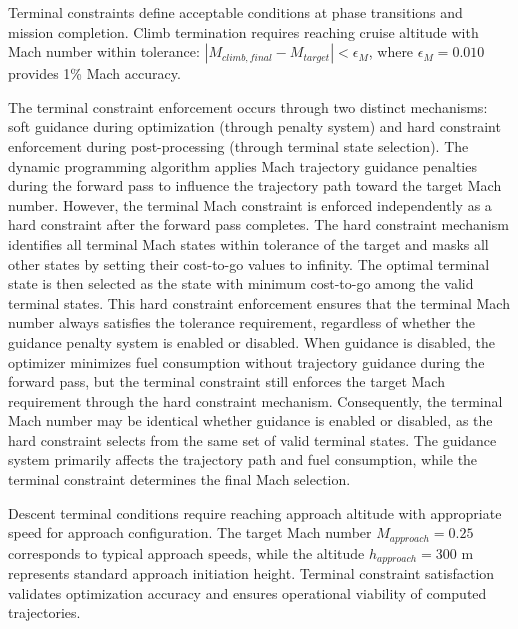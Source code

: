 Terminal constraints define acceptable conditions at phase transitions and mission completion. Climb termination requires reaching cruise altitude with Mach number within tolerance: $|M_{climb,final} - M_{target}| < \epsilon_M$, where $\epsilon_M = 0.010$ provides 1\% Mach accuracy.

The terminal constraint enforcement occurs through two distinct mechanisms: soft guidance during optimization (through penalty system) and hard constraint enforcement during post-processing (through terminal state selection). The dynamic programming algorithm applies Mach trajectory guidance penalties during the forward pass to influence the trajectory path toward the target Mach number. However, the terminal Mach constraint is enforced independently as a hard constraint after the forward pass completes. The hard constraint mechanism identifies all terminal Mach states within tolerance of the target and masks all other states by setting their cost-to-go values to infinity. The optimal terminal state is then selected as the state with minimum cost-to-go among the valid terminal states. This hard constraint enforcement ensures that the terminal Mach number always satisfies the tolerance requirement, regardless of whether the guidance penalty system is enabled or disabled. When guidance is disabled, the optimizer minimizes fuel consumption without trajectory guidance during the forward pass, but the terminal constraint still enforces the target Mach requirement through the hard constraint mechanism. Consequently, the terminal Mach number may be identical whether guidance is enabled or disabled, as the hard constraint selects from the same set of valid terminal states. The guidance system primarily affects the trajectory path and fuel consumption, while the terminal constraint determines the final Mach selection.

Descent terminal conditions require reaching approach altitude with appropriate speed for approach configuration. The target Mach number $M_{approach} = 0.25$ corresponds to typical approach speeds, while the altitude $h_{approach} = 300$ m represents standard approach initiation height. Terminal constraint satisfaction validates optimization accuracy and ensures operational viability of computed trajectories.
